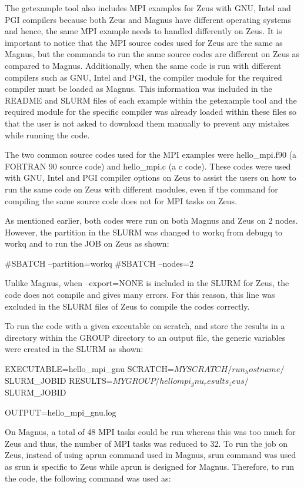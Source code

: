 \begin{Document}

The getexample tool also includes MPI examples for Zeus with GNU, Intel and PGI compilers because both Zeus and Magnus have different operating systems 
and hence, the same MPI example needs to handled differently on Zeus. It is important to notice that the MPI source codes used for Zeus are the same
as Magnus, but the commands to run the same source codes are different on Zeus as compared to Magnus. Additionally, when the same code is run 
with different compilers such as GNU, Intel and PGI, the compiler module for the required compiler must be loaded as Magnus. This information was
included in the README and SLURM files of each example within the getexample tool and the required module for the specific compiler was already loaded 
within these files so that the user is not asked to download them manually to prevent any mistakes while running the code.

The two common source codes used for the MPI examples were hello_mpi.f90 (a FORTRAN 90 source code) and hello_mpi.c (a c code). These codes were used 
with GNU, Intel and PGI compiler options on Zeus to assist the users on how to run the same code on Zeus with different modules, even if the command 
for compiling the same source code does not for MPI tasks on Zeus.

As mentioned earlier, both codes were run on both Magnus and Zeus on 2 nodes. However, the partition in the SLURM was changed to workq from debugq to 
workq and to run the JOB on Zeus as shown:

#SBATCH --partition=workq
#SBATCH --nodes=2

Unlike Magnus, when --export=NONE is included in the SLURM for Zeus, the code does not compile and gives many errors. For this reason, this line was
excluded in the SLURM files of Zeus to compile the codes correctly.

To run the code with a given executable on scratch, and store the results in a directory within the GROUP directory to an output file, the generic 
variables were created in the SLURM as shown:

EXECUTABLE=hello_mpi_gnu
SCRATCH=$MYSCRATCH/run_hostname/$SLURM_JOBID
RESULTS=$MYGROUP/hellompi_gnu_results_zeus/$SLURM_JOBID

OUTPUT=hello_mpi_gnu.log

On Magnus, a total of 48 MPI tasks could be run whereas this was too much for Zeus and thus, the number of MPI tasks was reduced to 32. To run the job
on Zeus, instead of using aprun command used in Magnus, srun command was used as srun is specific to Zeus while aprun is designed for Magnus. Therefore,
to run the code, the following command was used as:


\end{Document}
